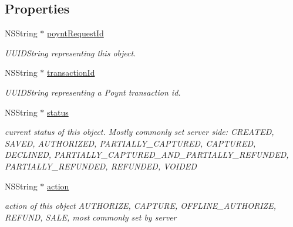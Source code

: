\subsection*{Properties}
\begin{DoxyCompactItemize}
\item 
N\+S\+String $\ast$ \hyperlink{interface_poynt_transaction_object_af3bd537ec19ed3fac0b5aa56812a1577}{poynt\+Request\+Id}
\begin{DoxyCompactList}\small\item\em U\+U\+I\+D\+String representing this object. \end{DoxyCompactList}\item 
N\+S\+String $\ast$ \hyperlink{interface_poynt_transaction_object_aacd11580c330a78310c344d78baecf8c}{transaction\+Id}
\begin{DoxyCompactList}\small\item\em U\+U\+I\+D\+String representing a Poynt transaction id. \end{DoxyCompactList}\item 
N\+S\+String $\ast$ \hyperlink{interface_poynt_transaction_object_ac2acf327011ce6ed9e26a41ceddaee31}{status}
\begin{DoxyCompactList}\small\item\em current status of this object. Mostly commonly set server side\+: \textquotesingle{}C\+R\+E\+A\+T\+ED\textquotesingle{}, \textquotesingle{}S\+A\+V\+ED\textquotesingle{}, \textquotesingle{}A\+U\+T\+H\+O\+R\+I\+Z\+ED\textquotesingle{}, \textquotesingle{}P\+A\+R\+T\+I\+A\+L\+L\+Y\+\_\+\+C\+A\+P\+T\+U\+R\+ED\textquotesingle{}, \textquotesingle{}C\+A\+P\+T\+U\+R\+ED\textquotesingle{}, \textquotesingle{}D\+E\+C\+L\+I\+N\+ED\textquotesingle{}, \textquotesingle{}P\+A\+R\+T\+I\+A\+L\+L\+Y\+\_\+\+C\+A\+P\+T\+U\+R\+E\+D\+\_\+\+A\+N\+D\+\_\+\+P\+A\+R\+T\+I\+A\+L\+L\+Y\+\_\+\+R\+E\+F\+U\+N\+D\+ED\textquotesingle{}, \textquotesingle{}P\+A\+R\+T\+I\+A\+L\+L\+Y\+\_\+\+R\+E\+F\+U\+N\+D\+ED\textquotesingle{}, \textquotesingle{}R\+E\+F\+U\+N\+D\+ED\textquotesingle{}, \textquotesingle{}V\+O\+I\+D\+ED\textquotesingle{} \end{DoxyCompactList}\item 
N\+S\+String $\ast$ \hyperlink{interface_poynt_transaction_object_aaab84b2e5d0ad0f648e7e0e17c6afa08}{action}
\begin{DoxyCompactList}\small\item\em action of this object  \textquotesingle{}A\+U\+T\+H\+O\+R\+I\+ZE\textquotesingle{}, \textquotesingle{}C\+A\+P\+T\+U\+RE\textquotesingle{}, \textquotesingle{}O\+F\+F\+L\+I\+N\+E\+\_\+\+A\+U\+T\+H\+O\+R\+I\+ZE\textquotesingle{}, \textquotesingle{}R\+E\+F\+U\+ND\textquotesingle{}, \textquotesingle{}S\+A\+LE\textquotesingle{}, most commonly set by server \end{DoxyCompactList}\item 

\end{DoxyCompactItemize}
